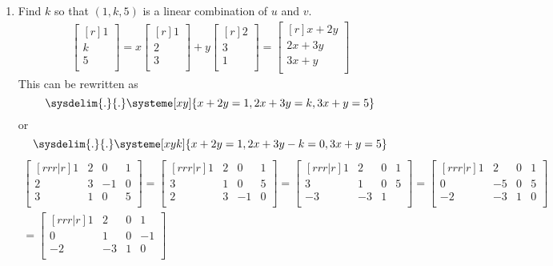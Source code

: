 \documentclass[12pt]{article}
\begin{document}
\begin{enumerate}
\begin{enumerate}
	\item Find $k$ so that $(1,k,5)$ is a linear combination of $u$ and $v$.
		\begin{align*}
		\begin{bmatrix}[r]1\\k\\5\\ \end{bmatrix}
		= x \begin{bmatrix}[r] 1\\2\\3\\ \end{bmatrix}
		+ y \begin{bmatrix}[r] 2\\3\\1\\ \end{bmatrix}
		= \begin{bmatrix}[r] x+2y\\ 2x+3y\\ 3x+y\\ \end{bmatrix}
		\end{align*}
		This can be rewritten as
		\[ \sysdelim{.}{.}\systeme[xy]{x+2y=1,2x+3y=k,3x+y=5} \]
		or
		\[ \sysdelim{.}{.}\systeme[xyk]{x+2y=1,2x+3y-k=0,3x+y=5} \]
		\begin{align*}
		\begin{bmatrix}[rrr|r] 1&2&0&1\\2&3&-1&0\\3&1&0&5\\ \end{bmatrix}
		= \begin{bmatrix}[rrr|r] 1&2&0&1\\3&1&0&5\\2&3&-1&0\\ \end{bmatrix}
		= \begin{bmatrix}[rrr|r] 1&2&0&1\\3&1&0&5\\-3&-3&1\\ \end{bmatrix}
		= \begin{bmatrix}[rrr|r] 1&2&0&1\\0&-5&0&5\\-2&-3&1&0\\ \end{bmatrix}\\
		= \begin{bmatrix}[rrr|r] 1&2&0&1\\0&1&0&-1\\-2&-3&1&0\\ \end{bmatrix}

\end{align*}
\end{enumerate}
\end{enumerate}
\end{document}
